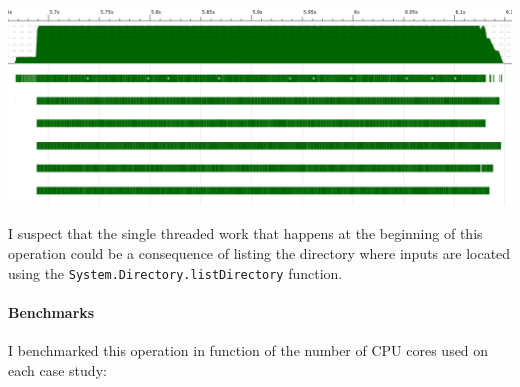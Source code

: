 \documentclass[a4paper,10pt]{article}
\begin{document}
\begin{center}
  \includegraphics[scale=0.3]{threadscope/ParRead}
\end{center}

I suspect that the single threaded work that happens at the beginning of this
operation could be a consequence of listing the directory where inputs are
located using the \texttt{System.Directory.listDirectory} function.

\paragraph{Benchmarks}
I benchmarked this operation in function of the number of CPU cores used on each
case study:\\
\end{document}
